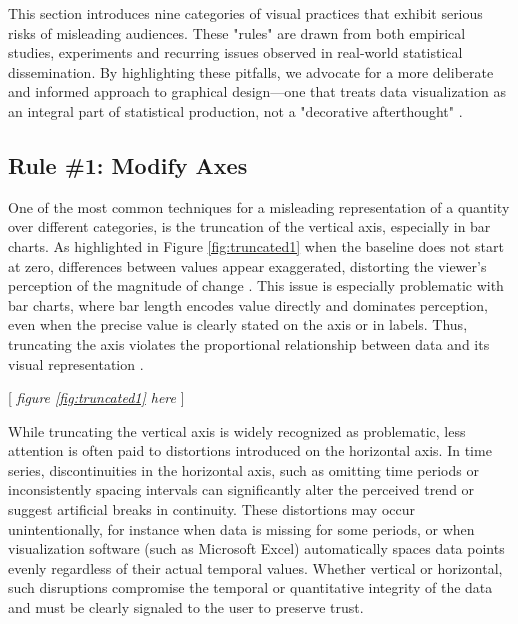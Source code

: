 \documentclass[11pt,twoside,a4paper]{article}
\begin{document}
This section introduces nine categories of visual practices that exhibit serious risks of misleading audiences. These "rules" are drawn from both empirical studies, experiments and recurring issues observed in real-world statistical dissemination. By highlighting these pitfalls, we advocate for a more deliberate and informed approach to graphical design—one that treats data visualization as an integral part of statistical production, not a "decorative afterthought" \citep{cairo2016truthful}.

\subsection*{Rule \#1: Modify Axes}

One of the most common techniques for a misleading representation of a quantity over different categories, is the truncation of the vertical axis, especially in bar charts. As highlighted in Figure \ref{fig:truncated1}  when the baseline does not start at zero, differences between values appear exaggerated, distorting the viewer’s perception of the magnitude of change \citep{Tufte2001,cairo2016truthful}. This issue is especially problematic with bar charts, where bar length encodes value directly and dominates perception, even when the precise value is clearly stated on the axis or in labels. Thus, truncating the axis violates the proportional relationship between data and its visual representation \citep{Leo2019economist}.

\begin{center}
    [ \textit{figure \ref{fig:truncated1}  here}  ]
\end{center}



While truncating the vertical axis is widely recognized as problematic, less attention is often paid to distortions introduced on the horizontal axis. In time series, discontinuities in the horizontal axis, such as omitting time periods or inconsistently spacing intervals can significantly alter the perceived trend or suggest artificial breaks in continuity. These distortions may occur unintentionally, for instance when data is missing for some periods, or when visualization software (such as Microsoft Excel) automatically spaces data points evenly regardless of their actual temporal values.
Whether vertical or horizontal, such disruptions compromise the temporal or quantitative integrity of the data and must be clearly signaled to the user to preserve trust.
\end{document}
